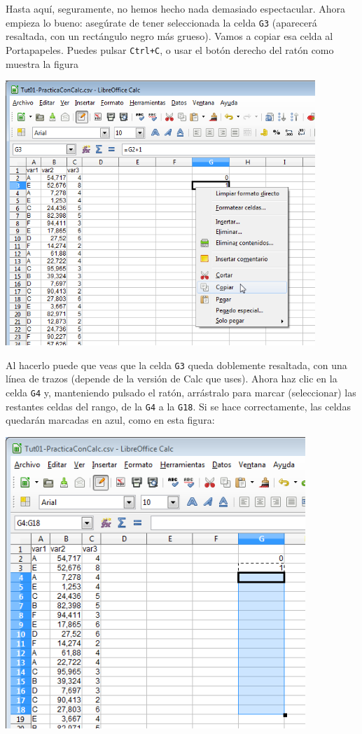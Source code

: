 \documentclass[10pt,a4paper]{article}\usepackage[]{graphicx}\usepackage[]{color}
\begin{document}
Hasta aquí, seguramente, no hemos hecho nada demasiado espectacular. Ahora empieza lo bueno: asegúrate de tener seleccionada la celda {\tt G3} (aparecerá resaltada, con un rectángulo negro más grueso). Vamos a copiar esa celda al Portapapeles. Puedes pulsar {\tt Ctrl+C}, o usar el botón derecho del ratón como muestra la figura
    \begin{center}
    \includegraphics[height=10cm]{../fig/Tut01-Calc-Formula-03.png}
    \end{center}
Al hacerlo puede que veas que la celda {\tt G3} queda doblemente resaltada, con una línea de trazos (depende de la versión de Calc que uses). Ahora haz clic en la celda {\tt G4} y, manteniendo pulsado el ratón, arrástralo para marcar (seleccionar) las restantes celdas del rango, de la {\tt G4} a la {\tt G18}. Si se hace correctamente, las celdas quedarán marcadas en azul, como en esta figura:
    \begin{center}
    \includegraphics[height=11cm]{../fig/Tut01-Calc-Formula-04.png}
    \end{center}
\end{document}
